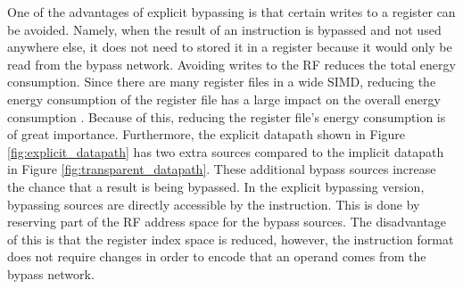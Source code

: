 

One of the advantages of explicit bypassing is that certain writes to a register can be avoided. Namely, when the result of an instruction is bypassed and not used anywhere else, it does not need to stored it in a register because it would only be read from the bypass network. Avoiding writes to the RF reduces the total energy consumption. Since there are many register files in a wide SIMD, reducing the energy consumption of the register file has a large impact on the overall energy consumption \cite{dongrio1}. Because of this, reducing the register file's energy consumption is of great importance. Furthermore, the explicit datapath shown in Figure \ref{fig:explicit_datapath} has two extra sources compared to the implicit datapath in Figure \ref{fig:transparent_datapath}. These additional bypass sources increase the chance that a result is being bypassed. In the explicit bypassing version, bypassing sources are directly accessible by the instruction. This is done by reserving part of the RF address space for the bypass sources. The disadvantage of this is that the register index space is reduced, however, the instruction format does not require changes in order to encode that an operand comes from the bypass network.

